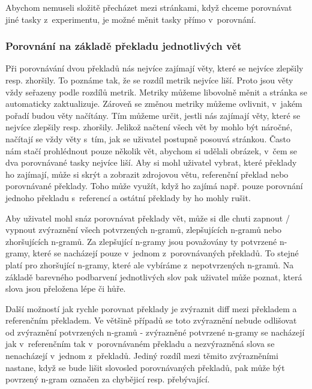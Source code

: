Abychom nemuseli složitě přecházet mezi stránkami,
  když chceme porovnávat jiné tasky z~experimentu,
  je možné měnit tasky přímo v~porovnání.


\subsubsection{Porovnání na základě překladu jednotlivých vět}
Při porovnávání dvou překladů nás nejvíce zajímají věty,
  které se nejvíce zlepšily resp. zhoršily.
To poznáme tak, že se rozdíl metrik nejvíce liší. 
Proto jsou věty vždy seřazeny podle rozdílů metrik.
Metriky můžeme libovolně měnit a stránka se automaticky zaktualizuje.
Zároveň se změnou metriky můžeme ovlivnit,
  v~jakém pořadí budou věty načítány.
Tím můžeme určit,
  jestli nás zajímají věty,
  které se nejvíce zlepšily resp. zhoršily.
Jelikož načtení všech vět by mohlo být náročné,
  načítají se vždy věty s~tím,
  jak se uživatel postupně posouvá stránkou.
Často nám stačí prohlédnout pouze několik vět,
  abychom si udělali obrázek,
  v~čem se dva porovnávané tasky nejvíce liší.
Aby si mohl uživatel vybrat,
  které překlady ho zajímají,
  může si skrýt a zobrazit zdrojovou větu, referenční překlad nebo porovnávané překlady.
Toho může využít, když ho zajímá např. pouze porovnání jednoho překladu s~referencí a
  ostátní překlady by ho mohly rušit.

Aby uživatel mohl snáz porovnávat překlady vět,
  může si dle chuti zapnout / vypnout zvýraznění všech potvrzených n-gramů,
  zlepšujících n-gramů nebo zhoršujících n-gramů.
Za zlepšující n-gramy jsou považovány ty potvrzené n-gramy,
  které se nacházejí pouze v~jednom z~porovnávaných překladů.
To stejné platí pro zhoršující n-gramy,
  které ale vybíráme z~nepotvrzených n-gramů.
Na základě barevného podbarvení jednotlivých slov pak uživatel může poznat,
  která slova jsou přeložena lépe či hůře.

Další možností jak rychle porovnat překlady je zvýraznit diff mezi překladem a referenčním překladem.
Ve většině případů se toto zvýraznění nebude odlišovat od zvýraznění potvrzených n-gramů -
  zvýrazněné potvrzené n-gramy se nacházejí jak v~referenčním tak v~porovnávaném překladu
  a nezvýrazněná slova se nenacházejí v~jednom z~překladů.
Jediný rozdíl mezi těmito zvýrazněními nastane,
  když se bude lišit slovosled porovnávaných překladů,
  pak může být povrzený n-gram označen za chybějicí resp. přebývající.

